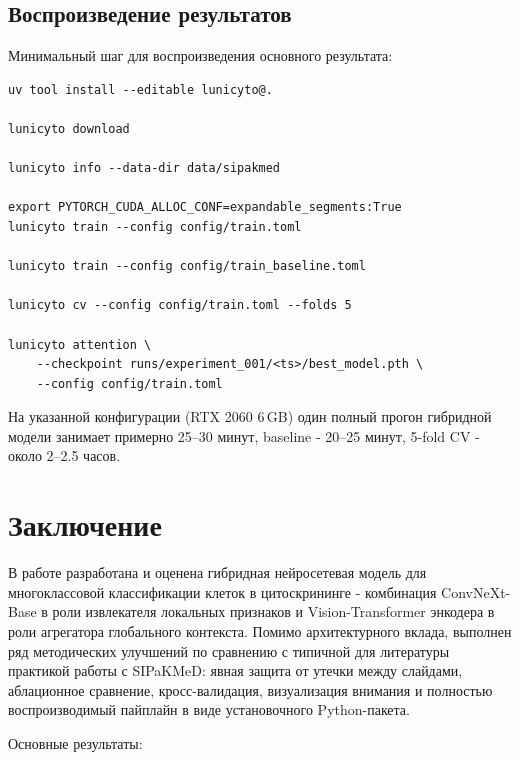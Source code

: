 \documentclass[14pt,a4paper]{extreport}
\begin{document}
\section{Воспроизведение результатов}

Минимальный шаг для воспроизведения основного результата:

\begin{lstlisting}[basicstyle=\ttfamily\footnotesize]
uv tool install --editable lunicyto@.

lunicyto download

lunicyto info --data-dir data/sipakmed

export PYTORCH_CUDA_ALLOC_CONF=expandable_segments:True
lunicyto train --config config/train.toml

lunicyto train --config config/train_baseline.toml

lunicyto cv --config config/train.toml --folds 5

lunicyto attention \
    --checkpoint runs/experiment_001/<ts>/best_model.pth \
    --config config/train.toml
\end{lstlisting}

На указанной конфигурации (RTX 2060 6\,GB) один полный прогон
гибридной модели занимает примерно 25--30 минут, baseline -
20--25 минут, 5-fold CV - около 2--2.5 часов.

\chapter*{Заключение}
\label{ch:conclusion}

В работе разработана и оценена гибридная нейросетевая модель для
многоклассовой классификации клеток в цитоскрининге - комбинация
ConvNeXt-Base в роли извлекателя локальных признаков и Vision-Transformer
энкодера в роли агрегатора глобального контекста. Помимо архитектурного
вклада, выполнен ряд методических улучшений по сравнению с типичной для
литературы практикой работы с SIPaKMeD: явная защита от утечки между
слайдами, аблационное сравнение, кросс-валидация, визуализация внимания и
полностью воспроизводимый пайплайн в виде установочного Python-пакета.

Основные результаты:
\end{document}
